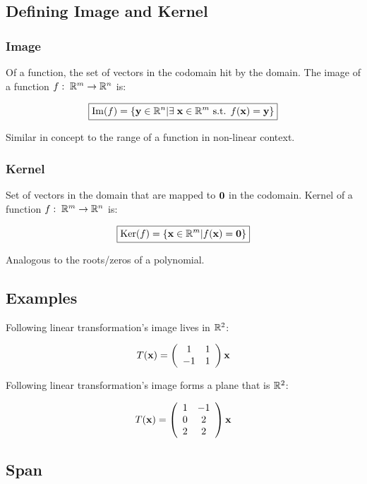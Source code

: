 \subsection{Defining Image and Kernel}

\subsubsection{Image}

Of a function, the set of vectors in the codomain hit by the domain.
The image of a function $f:\;\mathbb{R}^m\rightarrow \mathbb{R}^n$ is:

\[\boxed{
    \mathrm{Im}(f)=\{\textbf{y}\in \mathbb{R}^n | \exists\;\textbf{x}\in \mathbb{R}^m\text{ s.t. }f(\textbf{x})=\textbf{y}\}
}\]

Similar in concept to the range of a function in non-linear context.

\subsubsection{Kernel}

Set of vectors in the domain that are mapped to $\textbf{0}$ in the codomain.
Kernel of a function $f:\;\mathbb{R}^m\rightarrow \mathbb{R}^n$ is:

\[\boxed{
    \mathrm{Ker}(f)=\{\textbf{x}\in \mathbb{R}^m | f(\textbf{x})=\textbf{0}\}
}\]

Analogous to the roots/zeros of a polynomial.

\subsection{Examples}

Following linear transformation's image lives in $\mathbb{R}^2$:

\[T(\textbf{x})=\left(\begin{array}{cc}
    1 & 1 \\
    -1 & 1
    \end{array}\right) \textbf{x}\]

Following linear transformation's image forms a plane that is
$\mathbb{R}^2$:

\[T(\textbf{x})=\left(\begin{array}{cc}
    1 & -1 \\
    0 & 2 \\
    2 & 2
    \end{array}\right) \textbf{x}\]

\subsection{Span}

